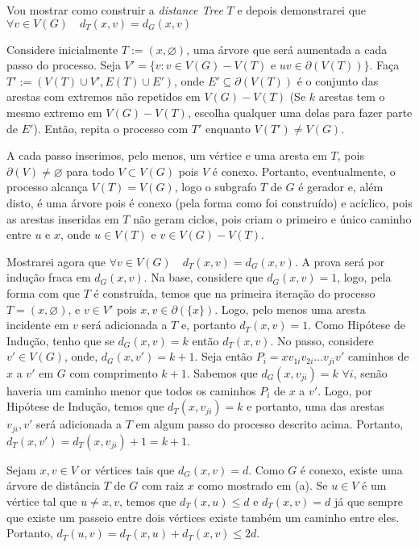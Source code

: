 Vou mostrar como construir a {\it distance Tree} $T$ e depois demonstrarei que $\forall v \in V(G)\quad d_T(x,v) = d_G(x,v)$

Considere inicialmente $T:=({x},\varnothing)$, uma árvore que será aumentada a cada passo do processo. Seja  $V' = \{v: v \in V(G) - V(T)$ e $uv \in \partial(V(T))\}$.
%
Faça $T' := (V(T)\cup V', E(T)\cup E')$,  onde $E' \subseteq \partial(V(T))$ é o conjunto das arestas com extremos não repetidos em $V(G) - V(T)$ (Se $k$ arestas tem o mesmo extremo em $V(G) - V(T)$, escolha qualquer uma delas para fazer parte de $E'$).
%
Então, repita o processo com $T'$ enquanto $V(T') \ne V(G)$.

A cada passo inserimos, pelo menos, um vértice e uma aresta em $T$, pois $\partial(V) \ne \varnothing$ para todo $V \subset V(G)$ pois $V$ é conexo.
%
Portanto, eventualmente, o processo alcança $V(T) = V(G)$, logo o subgrafo $T$ de $G$ é gerador e, além disto, é uma árvore pois é conexo (pela forma como foi construído) e acíclico, pois as arestas inseridas em $T$ não geram ciclos, pois criam o primeiro e único caminho entre $u$ e $x$, onde $u \in V(T)$ e $v \in V(G)-V(T)$.

Mostrarei agora que $\forall v \in V(G)\quad d_T(x,v) = d_G(x,v)$. A prova será por indução fraca em $d_G(x,v)$.
%
Na base, considere que $d_G(x,v) = 1$, logo, pela forma com que $T$ é construída, temos que na primeira iteração do processo $T=({x},\varnothing)$, e $v\in V'$ pois ${x,v} \in \partial(\{x\})$.
%
Logo, pelo menos uma aresta incidente em $v$ será adicionada a $T$ e, portanto $d_T(x,v) = 1$.
%
Como Hipótese de Indução, tenho que se $d_G(x,v) = k$ então $d_T(x,v)$.
%
No passo, considere $v' \in V(G)$, onde, $d_G(x,v') = k + 1$.
%
Seja então $P_i = xv_{1i}v_{2i}\ldots v_{ji}v'$ caminhos de $x$ a $v'$ em $G$ com comprimento $k + 1$. 
%
Sabemos que $d_G(x,v_{ji}) = k$ $\forall i$, senão haveria um caminho menor que todos os caminhos $P_i$ de $x$ a $v'$.
%
Logo, por Hipótese de Indução, temos que $d_T(x,v_{ji}) = k$ e portanto, uma das arestas ${v_{ji},v'}$ será adicionada a $T$ em algum passo do processo descrito acima.
%
Portanto, $d_T(x,v') = d_T(x,v_{ji}) + 1 = k + 1$.
\fimprova

Sejam $x,v \in V$ or vértices tais que $d_G(x,v) = d$. Como $G$ é conexo, existe
uma árvore de distância $T$ de $G$ com raiz $x$ como mostrado em (a). Se $u \in V$
é um vértice tal que $u \ne x,v$, temos que $d_T(x,u) \le d$ e $d_T(x,v) = d$ já
que sempre que existe um passeio entre dois vértices existe também um caminho
entre eles. Portanto, $d_T(u,v) = d_T(x,u) + d_T(x,v) \le 2d$.
\fimprova

